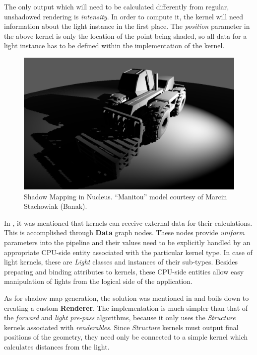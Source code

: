 The only output which will need to be calculated differently from regular, unshadowed rendering is \emph{intensity}. In order to compute it, the kernel will need information about the light instance in the first place. The \emph{position} parameter in the above kernel is only the location of the point being shaded, so all data for a light instance has to be defined within the implementation of the kernel.

\begin{figure}[ht!]
  \centering
    \includegraphics[width=0.9\linewidth]{./Figures/shadowMapping/manitouSM.png}
    \caption[SM in Nucleus]{Shadow Mapping in Nucleus. ``Manitou'' model courtesy of Marcin Stachowiak (Banak).}
  \label{fig:NucleusSM}
\end{figure}

In , it was mentioned that kernels can receive external data for their calculations. This is accomplished through \textbf{Data} graph nodes. These nodes provide \emph{uniform} parameters into the pipeline and their values need to be explicitly handled by an appropriate CPU-side entity associated with the particular kernel type. In case of light kernels, these are \emph{Light} classes and instances of their sub-types. Besides preparing and binding attributes to kernels, these CPU-side entities allow easy manipulation of lights from the logical side of the application.

As for shadow map generation, the solution was mentioned in  and boils down to creating a custom \textbf{Renderer}. The implementation is much simpler than that of the \emph{forward} and \emph{light pre-pass} algorithms, because it only uses the \emph{Structure} kernels associated with \emph{renderables}. Since \emph{Structure} kernels must output final positions of the geometry, they need only be connected to a simple kernel which calculates distances from the light.

